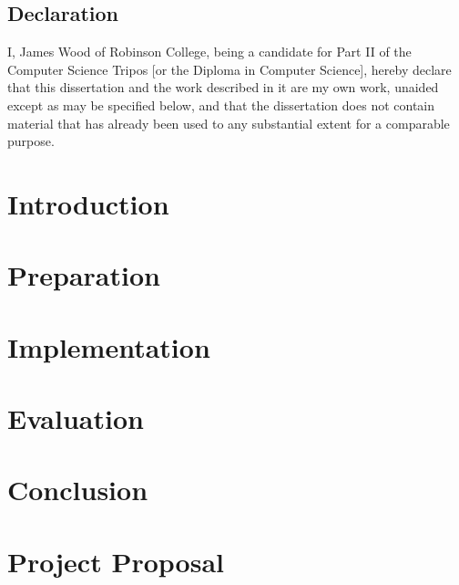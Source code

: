 \documentclass[12pt,a4paper,twoside,openright]{report}
\begin{document}
\newpage
\section*{Declaration}

I, James Wood of Robinson College, being a candidate for Part II of the Computer Science Tripos [or the Diploma in Computer Science], hereby declare that this dissertation and the work described in it are my own work, unaided except as may be specified below, and that the dissertation does not contain material that has already been used to any substantial extent for a comparable purpose.

\bigskip
{}

\medskip
{}

\tableofcontents

\listoffigures


\pagestyle{headings}

\chapter{Introduction}

\chapter{Preparation}

\chapter{Implementation}

\chapter{Evaluation}

\chapter{Conclusion}




\chapter{Project Proposal}


\end{document}

